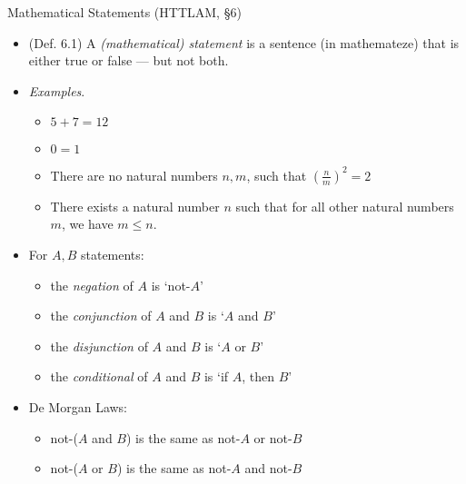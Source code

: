 \documentclass[../slides.tex]{subfiles}
\begin{document}
\begin{frame}{Mathematical Statements (HTTLAM, \S6)}

	\begin{itemize}
	
		\item (Def. 6.1) A \emph{(mathematical) statement} is a sentence (in mathemateze) that is either true or false --- but not both.
		
		\item \emph{Examples}.
		
			\begin{itemize}
			
				\item $5+7=12$
				
				\item $0=1$
				
				\item There are no natural numbers $n,m$, such that $(\frac{n}{m})^2=2$
				
				
				\item There exists a natural number $n$ such that for all other natural numbers $m$, we have $m\leq n$.
			
			\end{itemize}
			
			\item For $A,B$ statements:
			
				\begin{itemize}
				
					\item the \emph{negation} of $A$ is  `not-$A$'
					
					\item the \emph{conjunction} of $A$ and $B$ is `$A$ and $B$'
					
					\item the \emph{disjunction} of $A$ and $B$ is `$A$ or $B$'
					
					\item the \emph{conditional} of $A$ and $B$ is `if $A$, then $B$'
				
				\end{itemize}
				
			\item De Morgan Laws:
			
				\begin{itemize}
				
					\item not-($A$ and $B$) is the same as not-$A$ or not-$B$
					\item not-($A$ or $B$) is the same as not-$A$ and not-$B$
				
				\end{itemize}
	
	\end{itemize}


\end{frame}
\end{document}
